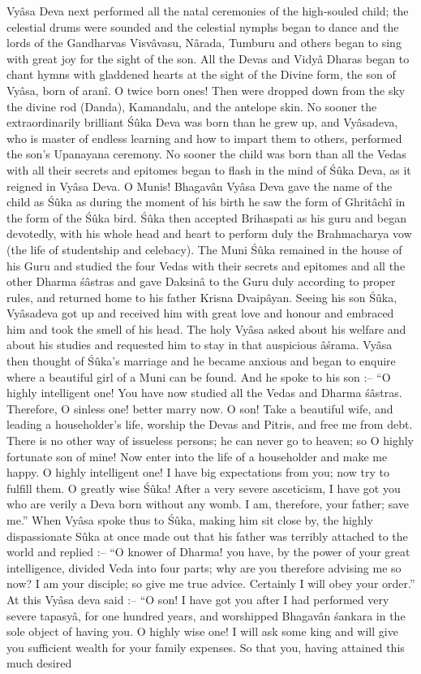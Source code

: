 Vy\^asa Deva next performed all the natal ceremonies of the high-souled child; the celestial drums were sounded and the celestial nymphs began to dance and the lords of the Gandharvas Visv\^avasu, N\^arada, Tumburu and others began to sing with great joy for the sight of the son. All the Devas and Vidy\^a Dharas began to chant hymns with gladdened hearts at the sight of the Divine form, the son of Vy\^asa, born of aran\^i. O twice born ones! Then were dropped down from the sky the divine rod (Danda), Kamandalu, and the antelope skin. No sooner the extraordinarily brilliant \'S\^uka Deva was born than he grew up, and Vy\^asadeva, who is master of endless learning and how to impart them to others, performed the son's Upanayana ceremony. No sooner the child was born than all the Vedas with all their secrets and epitomes began to flash in the mind of \'S\^uka Deva, as it reigned in Vy\^asa Deva. O Munis! Bhagav\^an Vy\^asa Deva gave the name of the child as \'S\^uka as during the moment of his birth he saw the form of Ghrit\^ach\^i in the form of the \'S\^uka bird. \'S\^uka then accepted Brihaspati as his guru and began devotedly, with his whole head and heart to perform duly the Brahmacharya vow (the life of studentship and celebacy). The Muni \'S\^uka remained in the house of his Guru and studied the four Vedas with their secrets and epitomes and all the other Dharma \'s\^astras and gave Daksin\^a to the Guru duly according to proper rules, and returned home to his father Krisna Dvaip\^ayan. Seeing his son \'S\^uka, Vy\^asadeva got up and received him with great love and honour and embraced him and took the smell of his head. The holy Vy\^asa asked about his welfare and about his studies and requested him to stay in that auspicious \^a\'srama. Vy\^asa then thought of \'S\^uka's marriage and he became anxious and began to enquire where a beautiful girl of a Muni can be found. And he spoke to his son :-- ``O highly intelligent one! You have now studied all the Vedas and Dharma \'s\^astras. Therefore, O sinless one! better marry now. O son! Take a beautiful wife, and leading a householder's life, worship the Devas and Pitris, and free me from debt. There is no other way of issueless persons; he can never go to heaven; so O highly fortunate son of mine! Now enter into the life of a householder and make me happy. O highly intelligent one! I have big expectations from you; now try to fulfill them. O greatly wise \'S\^uka! After a very severe asceticism, I have got you who are verily a Deva born without any womb. I am, therefore, your father; save me.'' When Vy\^asa spoke thus to \'S\^uka, making him sit close by, the highly dispassionate S\^uka at once made out that his father was terribly attached to the world and replied :-- ``O knower of Dharma! you have, by the power of your great intelligence, divided Veda into four parts; why are you therefore advising me so now? I am your disciple; so give me true advice. Certainly I will obey your order.'' At this Vy\^asa deva said :-- ``O son! I have got you after I had performed very severe tapasy\^a, for one hundred years, and worshipped Bhagav\^an \'sankara in the sole object of having you. O highly wise one! I will ask some king and will give you sufficient wealth for your family expenses. So that you, having attained this much desired 